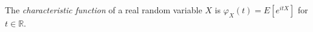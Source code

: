 
The \emph{characteristic function} of a real random variable $X$ is $\varphi_X(t)=E[e^{itX}]$ for $t\in\mathbb R$.

